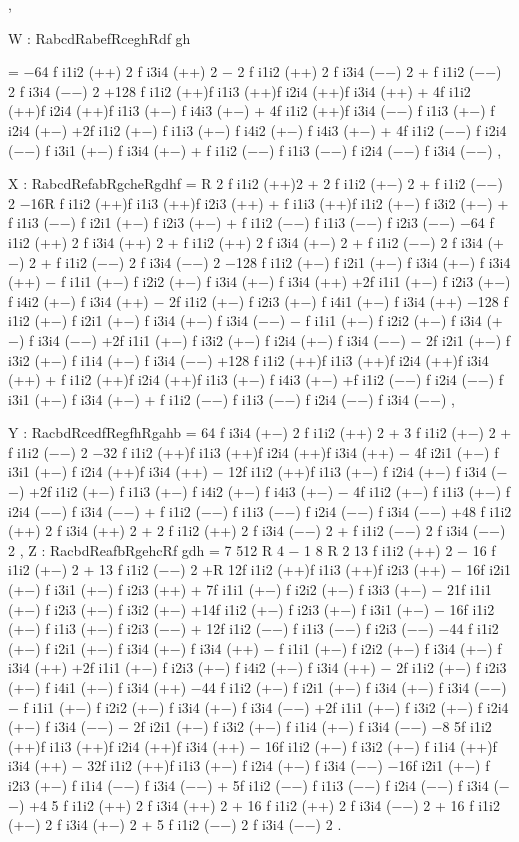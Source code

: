 \documentclass{article}
\begin{document}
,

W : RabcdRabefRceghRdf gh

= −64 f i1i2 (++) 2 f i3i4 (++) 2 − 2 f i1i2 (++) 2 f i3i4 (−−) 2 + f i1i2 (−−) 2 f i3i4 (−−) 2 +128 f i1i2 (++)f i1i3 (++)f i2i4 (++)f i3i4 (++) + 4f i1i2 (++)f i2i4 (++)f i1i3 (+−) f i4i3 (+−) + 4f i1i2 (++)f i3i4 (−−) f i1i3 (+−) f i2i4 (+−) +2f i1i2 (+−) f i1i3 (+−) f i4i2 (+−) f i4i3 (+−) + 4f i1i2 (−−) f i2i4 (−−) f i3i1 (+−) f i3i4 (+−) + f i1i2 (−−) f i1i3 (−−) f i2i4 (−−) f i3i4 (−−) ,

X : RabcdRefabRgcheRgdhf = R 2 f i1i2 (++)2 + 2 f i1i2 (+−) 2 + f i1i2 (−−) 2 −16R f i1i2 (++)f i1i3 (++)f i2i3 (++) + f i1i3 (++)f i1i2 (+−) f i3i2 (+−) + f i1i3 (−−) f i2i1 (+−) f i2i3 (+−) + f i1i2 (−−) f i1i3 (−−) f i2i3 (−−) −64 f i1i2 (++) 2 f i3i4 (++) 2 + f i1i2 (++) 2 f i3i4 (+−) 2 + f i1i2 (−−) 2 f i3i4 (+−) 2 + f i1i2 (−−) 2 f i3i4 (−−) 2 −128 f i1i2 (+−) f i2i1 (+−) f i3i4 (+−) f i3i4 (++) − f i1i1 (+−) f i2i2 (+−) f i3i4 (+−) f i3i4 (++) +2f i1i1 (+−) f i2i3 (+−) f i4i2 (+−) f i3i4 (++) − 2f i1i2 (+−) f i2i3 (+−) f i4i1 (+−) f i3i4 (++) −128 f i1i2 (+−) f i2i1 (+−) f i3i4 (+−) f i3i4 (−−) − f i1i1 (+−) f i2i2 (+−) f i3i4 (+−) f i3i4 (−−) +2f i1i1 (+−) f i3i2 (+−) f i2i4 (+−) f i3i4 (−−) − 2f i2i1 (+−) f i3i2 (+−) f i1i4 (+−) f i3i4 (−−) +128 f i1i2 (++)f i1i3 (++)f i2i4 (++)f i3i4 (++) + f i1i2 (++)f i2i4 (++)f i1i3 (+−) f i4i3 (+−) +f i1i2 (−−) f i2i4 (−−) f i3i1 (+−) f i3i4 (+−) + f i1i2 (−−) f i1i3 (−−) f i2i4 (−−) f i3i4 (−−) ,

Y : RacbdRcedfRegfhRgahb = 64 f i3i4 (+−) 2 f i1i2 (++) 2 + 3 f i1i2 (+−) 2 + f i1i2 (−−) 2 −32 f i1i2 (++)f i1i3 (++)f i2i4 (++)f i3i4 (++) − 4f i2i1 (+−) f i3i1 (+−) f i2i4 (++)f i3i4 (++) − 12f i1i2 (++)f i1i3 (+−) f i2i4 (+−) f i3i4 (−−) +2f i1i2 (+−) f i1i3 (+−) f i4i2 (+−) f i4i3 (+−) − 4f i1i2 (+−) f i1i3 (+−) f i2i4 (−−) f i3i4 (−−) + f i1i2 (−−) f i1i3 (−−) f i2i4 (−−) f i3i4 (−−) +48 f i1i2 (++) 2 f i3i4 (++) 2 + 2 f i1i2 (++) 2 f i3i4 (−−) 2 + f i1i2 (−−) 2 f i3i4 (−−) 2 , Z : RacbdReafbRgehcRf gdh = 7 512 R 4 − 1 8 R 2 13 f i1i2 (++) 2 − 16 f i1i2 (+−) 2 + 13 f i1i2 (−−) 2 +R 12f i1i2 (++)f i1i3 (++)f i2i3 (++) − 16f i2i1 (+−) f i3i1 (+−) f i2i3 (++) + 7f i1i1 (+−) f i2i2 (+−) f i3i3 (+−) − 21f i1i1 (+−) f i2i3 (+−) f i3i2 (+−) +14f i1i2 (+−) f i2i3 (+−) f i3i1 (+−) − 16f i1i2 (+−) f i1i3 (+−) f i2i3 (−−) + 12f i1i2 (−−) f i1i3 (−−) f i2i3 (−−) −44 f i1i2 (+−) f i2i1 (+−) f i3i4 (+−) f i3i4 (++) − f i1i1 (+−) f i2i2 (+−) f i3i4 (+−) f i3i4 (++) +2f i1i1 (+−) f i2i3 (+−) f i4i2 (+−) f i3i4 (++) − 2f i1i2 (+−) f i2i3 (+−) f i4i1 (+−) f i3i4 (++) −44 f i1i2 (+−) f i2i1 (+−) f i3i4 (+−) f i3i4 (−−) − f i1i1 (+−) f i2i2 (+−) f i3i4 (+−) f i3i4 (−−) +2f i1i1 (+−) f i3i2 (+−) f i2i4 (+−) f i3i4 (−−) − 2f i2i1 (+−) f i3i2 (+−) f i1i4 (+−) f i3i4 (−−) −8 5f i1i2 (++)f i1i3 (++)f i2i4 (++)f i3i4 (++) − 16f i1i2 (+−) f i3i2 (+−) f i1i4 (++)f i3i4 (++) − 32f i1i2 (++)f i1i3 (+−) f i2i4 (+−) f i3i4 (−−) −16f i2i1 (+−) f i2i3 (+−) f i1i4 (−−) f i3i4 (−−) + 5f i1i2 (−−) f i1i3 (−−) f i2i4 (−−) f i3i4 (−−) +4 5 f i1i2 (++) 2 f i3i4 (++) 2 + 16 f i1i2 (++) 2 f i3i4 (−−) 2 + 16 f i1i2 (+−) 2 f i3i4 (+−) 2 + 5 f i1i2 (−−) 2 f i3i4 (−−) 2 .
\end{document}
